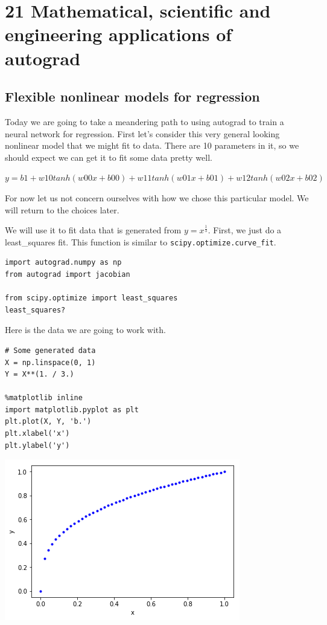 \documentclass[11pt]{article}
\begin{document}
\section{21 Mathematical, scientific and engineering applications of autograd}
\label{sec:orgb3ca8d3}

\subsection{Flexible nonlinear models for regression}
\label{sec:org029b006}

Today we are going to take a meandering path to using autograd to train a neural network for regression. First let's consider this very general looking nonlinear model that we might fit to data. There are 10 parameters in it, so we should expect we can get it to fit some data pretty well.

\(y = b1 + w10 tanh(w00 x + b00) + w11 tanh(w01 x + b01) + w12 tanh(w02 x + b02)\)

For now let us not concern ourselves with how we chose this particular model. We will return to the choices later.

We will use it to fit data that is generated from \(y = x^\frac{1}{3}\). First, we just do a least\_squares fit. This function is similar to \texttt{scipy.optimize.curve\_fit}.

\begin{verbatim}
import autograd.numpy as np
from autograd import jacobian

from scipy.optimize import least_squares
least_squares?
\end{verbatim}


Here is the data we are going to work with.

\begin{verbatim}
# Some generated data
X = np.linspace(0, 1)
Y = X**(1. / 3.)

%matplotlib inline
import matplotlib.pyplot as plt
plt.plot(X, Y, 'b.')
plt.xlabel('x')
plt.ylabel('y')
\end{verbatim}

\begin{center}
\includegraphics[width=.9\linewidth]{obipy-resources/de048b6a9afb1b9e2b48e7a057512e1e-70304FPI.png}
\end{center}
\end{document}
